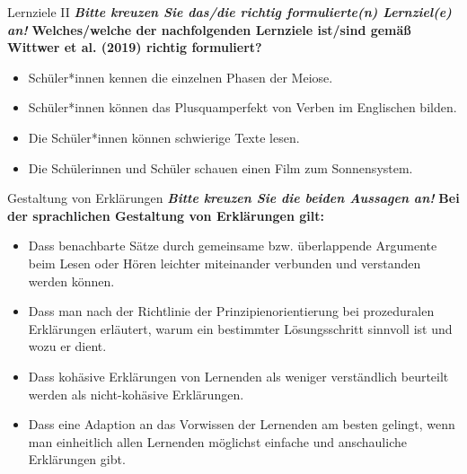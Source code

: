 \documentclass[a4paper]{article}
\newcommand{\ACorrectAnswer}{\rlap{$\square$}{\raisebox{2pt}{\large\hspace{1pt}\ding{51}}}\hspace{-2.5pt}}
\newcommand{\AWrongAnswer}{\rlap{$\square$}{\large\hspace{1pt}\ding{55}}}
\newcommand{\AnUnsureAnswer}{\rlap{$\square$}{\large\hspace{1pt}\textbf?}}
\newcommand{\defaultCorrect}{\ding{51}}
\newcommand{\defaultWrong}{\ding{55}}
\newcommand{\defaultUnsure}{\textbf{?}}
\newenvironment{answers}{\begin{itemize}}{\end{itemize}}
\newcommand{\correct}{\defaultCorrect}
\newcommand{\wrong}{\defaultWrong}
\newcommand{\unsure}{\defaultUnsure}
\newenvironment{question}[2]{%
    \section[#1 \normalfont(#2)]{#1\\\small\normalfont\hyperlink{tableofcontents}{zurück zum Inhaltsverzeichnis}}%
}{%
    \newpage%
}
\newcommand{\questiontext}[1]{\textbf{#1}}
\newcommand{\assignment}[1]{\textbf{\textit{#1}}\newline}
\newenvironment{multiple-choice}[1]{%
    \begin{question}{#1}{Multiple Choice}%
    \renewenvironment{answers}{%
        \begin{multiple-choice-list}}{\end{multiple-choice-list}%
    }%
    \renewcommand{\correct}{\ACorrectAnswer}%
    \renewcommand{\wrong}{\AWrongAnswer}%
    \renewcommand{\unsure}{\AnUnsureAnswer}%
}%
{%
    \renewcommand{\correct}{\defaultCorrect}%
    \renewcommand{\wrong}{\defaultWrong}%
    \renewcommand{\unsure}{\defaultUnsure}%
    \end{question}%
}
\begin{document}
\begin{multiple-choice}{Lernziele II}
    \assignment{Bitte kreuzen Sie das/die richtig formulierte(n) Lernziel(e) an!}
    \questiontext{Welches/welche der nachfolgenden Lernziele ist/sind gemäß Wittwer et al. (2019) richtig formuliert?}
    \begin{answers}
        \item[\correct] Schüler*innen kennen die einzelnen Phasen der Meiose.
        \item[\correct] Schüler*innen können das Plusquamperfekt von Verben im Englischen bilden.
        \item[\wrong] Die Schüler*innen können schwierige Texte lesen.
        \item[\wrong] Die Schülerinnen und Schüler schauen einen Film zum Sonnensystem.   
    \end{answers}
\end{multiple-choice}

\begin{multiple-choice}{Gestaltung von Erklärungen}
    \assignment{Bitte kreuzen Sie die beiden Aussagen an!}
    \questiontext{Bei der sprachlichen Gestaltung von Erklärungen gilt:}
    \begin{answers}
        \item[\correct] Dass benachbarte Sätze durch gemeinsame bzw. überlappende Argumente beim Lesen oder Hören leichter miteinander verbunden und verstanden werden können.
        \item[\correct] Dass man nach der Richtlinie der Prinzipienorientierung bei prozeduralen Erklärungen erläutert, warum ein bestimmter Lösungsschritt sinnvoll ist und wozu er dient.
        \item[\wrong] Dass kohäsive Erklärungen von Lernenden als weniger verständlich beurteilt werden als nicht-kohäsive Erklärungen.
        \item[\wrong] Dass eine Adaption an das Vorwissen der Lernenden am besten gelingt, wenn man einheitlich allen Lernenden möglichst einfache und anschauliche Erklärungen gibt.
    \end{answers}
\end{multiple-choice}
\end{document}

